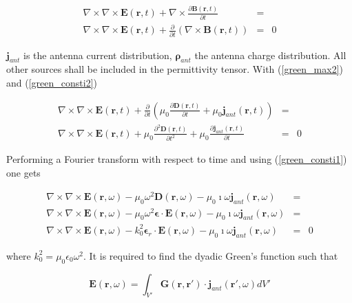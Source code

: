 \documentclass[a4paper,11pt]{thesis}
\begin{document}
\begin{eqnarray}
\nabla \times \nabla \times \mathbf{E}(\mathbf{r},t) + \nabla \times \frac{\partial \mathbf{B}(\mathbf{r},t)}{\partial t} &=& \\
\nabla \times \nabla \times \mathbf{E}(\mathbf{r},t) +  \frac{\partial }{\partial t} \left(\nabla \times \mathbf{B}(\mathbf{r},t)\right) &=& 0\label{electric_relation}
\end{eqnarray}

$\mathbf{j}_{ant}$ is the antenna current distribution, $\mathbf{\rho}_{ant}$ the antenna charge distribution. All other sources shall be included in the permittivity tensor. With (\ref{green_max2}) and (\ref{green_consti2})

\begin{eqnarray}
\nabla \times \nabla \times \mathbf{E}(\mathbf{r},t) +  \frac{\partial }{\partial t} \left(\mu_0 \frac{\partial \mathbf{D}(\mathbf{r},t)}{\partial t}+ \mu_0 \mathbf{j}_{ant}(\mathbf{r},t)\right) &=&\\
\nabla \times \nabla \times \mathbf{E}(\mathbf{r},t) +   \mu_0 \frac{\partial^2 \mathbf{D}(\mathbf{r},t)}{\partial t^2}+ \mu_0 \frac{\partial  \mathbf{j}_{ant}(\mathbf{r},t)}{\partial t} &=&0
\end{eqnarray}

Performing a Fourier transform with respect to time and using (\ref{green_consti1}) one gets

\begin{eqnarray}
\nabla \times \nabla \times \mathbf{E}(\mathbf{r},\omega) -   \mu_0 \omega^2 \mathbf{D}(\mathbf{r},\omega) - \mu_0 \imath \omega   \mathbf{j}_{ant}(\mathbf{r},\omega) &=&\label{electric_relation} \\
\nabla \times \nabla \times \mathbf{E}(\mathbf{r},\omega) -   \mu_0 \omega^2 \mathbf{\epsilon}\cdot \mathbf{E}(\mathbf{r},\omega) - \mu_0 \imath \omega   \mathbf{j}_{ant}(\mathbf{r},\omega) &=&\nonumber \\
\nabla \times \nabla \times \mathbf{E}(\mathbf{r},\omega) -   k_0^2 \mathbf{\epsilon}_r\cdot \mathbf{E}(\mathbf{r},\omega) - \mu_0 \imath \omega   \mathbf{j}_{ant}(\mathbf{r},\omega) &=&0\nonumber
\end{eqnarray}

where $k_0^2=\mu_0 \epsilon_0 \omega^2$. It is required to find the dyadic Green's function such that

\begin{equation}
    \mathbf{E}(\mathbf{r},\omega)=\int_{V'} \mathbf{G}(\mathbf{r},\mathbf{r'})\cdot \mathbf{j}_{ant}(\mathbf{r'},\omega) dV'\label{def_greens_function}
\end{equation}
\end{document}

